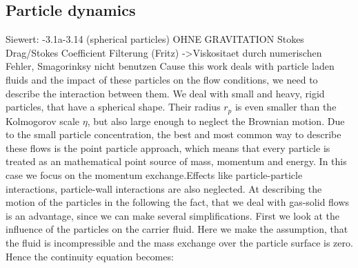 \documentclass[a4paper,10pt]{article}
\numberwithin{equation}{section} %
\begin{document}
\subsection{Particle dynamics} %
Siewert:
-3.1a-3.14 (spherical particles) OHNE GRAVITATION
Stokes Drag/Stokes Coefficient
Filterung (Fritz) ->Viskositaet durch numerischen Fehler, Smagorinksy nicht benutzen
\pagebreak
Cause this work deals with particle laden fluids and the impact of these particles on the flow conditions, we need to describe the interaction between them. 
We deal with small and heavy, rigid particles, that have a spherical shape. Their radius $ r_p $ is even smaller than the Kolmogorov scale $ \eta $, but also large enough to neglect the Brownian motion.
Due to the small particle concentration, the best and most common way to describe these flows is the point particle approach, which means that every particle is treated as an mathematical point source of mass, momentum and energy. In this case we focus on the momentum exchange.Effects like particle-particle interactions, particle-wall interactions are also neglected.  
At describing the motion of the particles in the following the fact, that we deal with gas-solid flows is an advantage, since we can make several simplifications.
First we look at the influence of the particles on the carrier fluid. Here we make the assumption, that the fluid is incompressible and the mass exchange over the particle surface is zero.
Hence the continuity equation becomes:
\end{document}

